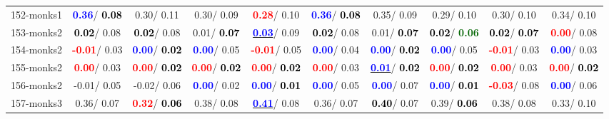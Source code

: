 \begin{table}[h]
\begin{center}
{\begin{tabular}{lc|c|c|c|c|c|c|c|c}
152-monks1 & \textcolor{blue}{\textbf{  0.36}}/\textcolor{black}{\textbf{  0.08}} &   0.30/  0.11 &   0.30/  0.09 & \textcolor{red}{\textbf{  0.28}}/  0.10 & \textcolor{blue}{\textbf{  0.36}}/\textcolor{black}{\textbf{  0.08}} &   0.35/  0.09 &   0.29/  0.10 &   0.30/  0.10 &   0.34/  0.10 \\
153-monks2 & \textcolor{black}{\textbf{  0.02}}/  0.08 & \textcolor{black}{\textbf{  0.02}}/  0.08 &   0.01/\textcolor{black}{\textbf{  0.07}} & \underline{\textcolor{blue}{\textbf{  0.03}}}/  0.09 & \textcolor{black}{\textbf{  0.02}}/  0.08 &   0.01/\textcolor{black}{\textbf{  0.07}} & \textcolor{black}{\textbf{  0.02}}/\textcolor{darkgreen}{\textbf{  0.06}} & \textcolor{black}{\textbf{  0.02}}/\textcolor{black}{\textbf{  0.07}} & \textcolor{red}{\textbf{  0.00}}/  0.08 \\
154-monks2 & \textcolor{red}{\textbf{ -0.01}}/  0.03 & \textcolor{blue}{\textbf{  0.00}}/\textcolor{black}{\textbf{  0.02}} & \textcolor{blue}{\textbf{  0.00}}/  0.05 & \textcolor{red}{\textbf{ -0.01}}/  0.05 & \textcolor{blue}{\textbf{  0.00}}/  0.04 & \textcolor{blue}{\textbf{  0.00}}/\textcolor{black}{\textbf{  0.02}} & \textcolor{blue}{\textbf{  0.00}}/  0.05 & \textcolor{red}{\textbf{ -0.01}}/  0.03 & \textcolor{blue}{\textbf{  0.00}}/  0.03 \\
155-monks2 & \textcolor{red}{\textbf{  0.00}}/  0.03 & \textcolor{red}{\textbf{  0.00}}/\textcolor{black}{\textbf{  0.02}} & \textcolor{red}{\textbf{  0.00}}/\textcolor{black}{\textbf{  0.02}} & \textcolor{red}{\textbf{  0.00}}/\textcolor{black}{\textbf{  0.02}} & \textcolor{red}{\textbf{  0.00}}/  0.03 & \underline{\textcolor{blue}{\textbf{  0.01}}}/\textcolor{black}{\textbf{  0.02}} & \textcolor{red}{\textbf{  0.00}}/\textcolor{black}{\textbf{  0.02}} & \textcolor{red}{\textbf{  0.00}}/  0.03 & \textcolor{red}{\textbf{  0.00}}/\textcolor{black}{\textbf{  0.02}} \\
156-monks2 &  -0.01/  0.05 &  -0.02/  0.06 & \textcolor{blue}{\textbf{  0.00}}/  0.02 & \textcolor{blue}{\textbf{  0.00}}/\textcolor{black}{\textbf{  0.01}} & \textcolor{blue}{\textbf{  0.00}}/  0.05 & \textcolor{blue}{\textbf{  0.00}}/  0.07 & \textcolor{blue}{\textbf{  0.00}}/\textcolor{black}{\textbf{  0.01}} & \textcolor{red}{\textbf{ -0.03}}/  0.08 & \textcolor{blue}{\textbf{  0.00}}/  0.06 \\ \hline
157-monks3 &   0.36/  0.07 & \textcolor{red}{\textbf{  0.32}}/\textcolor{black}{\textbf{  0.06}} &   0.38/  0.08 & \underline{\textcolor{blue}{\textbf{  0.41}}}/  0.08 &   0.36/  0.07 & \textcolor{black}{\textbf{  0.40}}/  0.07 &   0.39/\textcolor{black}{\textbf{  0.06}} &   0.38/  0.08 &   0.33/  0.10 \\

\end{tabular}}
\end{center}
\end{table}
